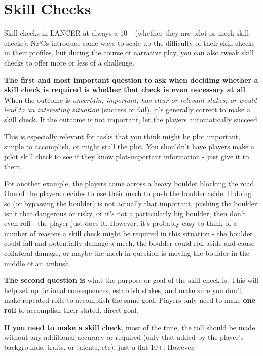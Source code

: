 \section{Skill Checks}

Skill checks in LANCER at always a 10+ (whether they are pilot or mech skill checks). NPCs
introduce some ways to scale up the difficulty of their skill checks in their profiles, but during the
course of narrative play, you can also tweak skill checks to offer more or less of a challenge.

\textbf{The first and most important question to ask when deciding whether a skill check is
required is whether that check is even necessary at all}. When the outcome is \textit{uncertain,
important, has clear or relevant stakes, or would lead to an interesting situation} (success or fail),
it’s generally correct to make a skill check. If the outcome is not important, let the players
automatically succeed.

This is especially relevant for tasks that you think might be plot important, simple to accomplish,
or might stall the plot. You shouldn’t have players make a pilot skill check to see if they know
plot-important information - just give it to them.

For another example, the players come across a heavy boulder blocking the road. One of the
players decides to use their mech to push the boulder aside. If doing so (or bypassing the
boulder) is not actually that important, pushing the boulder isn’t that dangerous or risky, or it’s
not a particularly big boulder, then don’t even roll - the player just does it. However, it’s probably
easy to think of a number of reasons a skill check might be required in this situation - the boulder
could fall and potentially damage a mech, the boulder could roll aside and cause collateral
damage, or maybe the mech in question is moving the boulder in the middle of an ambush.

\textbf{The second question is} what the purpose or goal of the skill check is. This will help set up
fictional consequences, establish stakes, and make sure you don’t make repeated rolls to
accomplish the same goal. Players only need to make \textbf{one roll} to accomplish their stated, direct
goal.

\textbf{If you need to make a skill check}, most of the time, the roll should be made without any
additional accuracy or \Difficulty required (only that added by the player’s backgrounds, traits, or
talents, etc), just a flat 10+. However:

